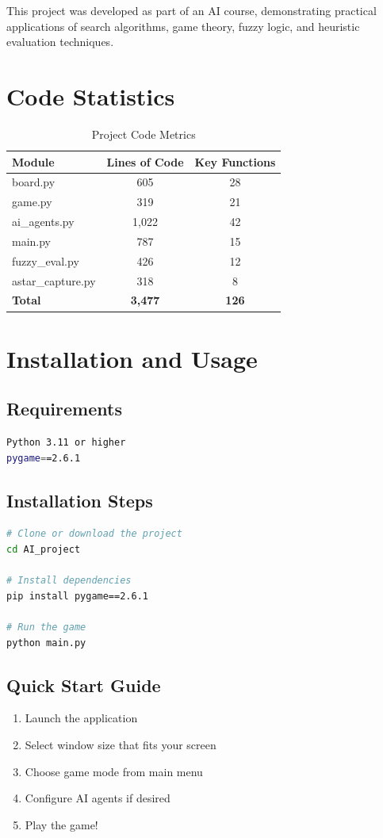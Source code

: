 \documentclass[12pt,a4paper]{article}
\begin{document}
This project was developed as part of an AI course, demonstrating practical applications of search algorithms, game theory, fuzzy logic, and heuristic evaluation techniques.

\appendix

\section{Code Statistics}

\begin{table}[H]
\centering
\caption{Project Code Metrics}
\begin{tabular}{@{}lcc@{}}
\toprule
\textbf{Module} & \textbf{Lines of Code} & \textbf{Key Functions} \\
\midrule
board.py & 605 & 28 \\
game.py & 319 & 21 \\
ai\_agents.py & 1,022 & 42 \\
main.py & 787 & 15 \\
fuzzy\_eval.py & 426 & 12 \\
astar\_capture.py & 318 & 8 \\
\midrule
\textbf{Total} & \textbf{3,477} & \textbf{126} \\
\bottomrule
\end{tabular}
\end{table}

\section{Installation and Usage}

\subsection{Requirements}
\begin{lstlisting}[language=bash]
Python 3.11 or higher
pygame==2.6.1
\end{lstlisting}

\subsection{Installation Steps}
\begin{lstlisting}[language=bash]
# Clone or download the project
cd AI_project

# Install dependencies
pip install pygame==2.6.1

# Run the game
python main.py
\end{lstlisting}

\subsection{Quick Start Guide}
\begin{enumerate}
    \item Launch the application
    \item Select window size that fits your screen
    \item Choose game mode from main menu
    \item Configure AI agents if desired
    \item Play the game!
\end{enumerate}
\end{document}
